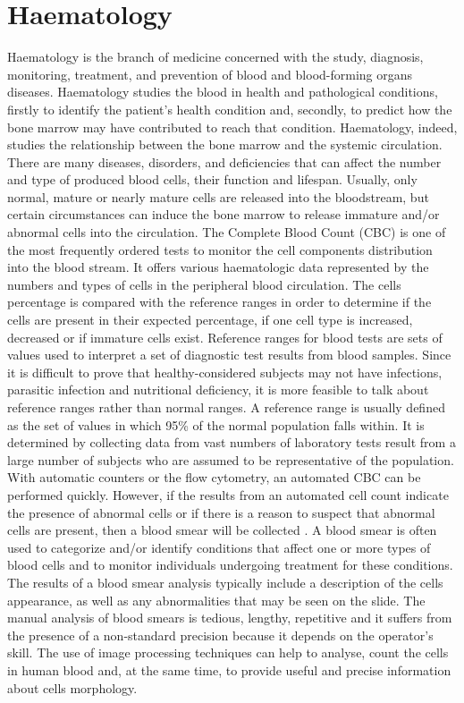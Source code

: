\documentclass[final,a4paper,12pt,english]{UnicaPhdThesis3}
\begin{document}
\section{Haematology} %
Haematology is the branch of medicine concerned with the study, diagnosis, monitoring, treatment, and prevention of blood and blood-forming organs diseases. Haematology studies the blood in health and pathological conditions, firstly to identify the patient’s health condition and, secondly, to predict how the bone marrow may have contributed to reach that condition. 
Haematology, indeed, studies the relationship between the bone marrow and the systemic circulation. There are many diseases, disorders, and deficiencies that can affect the number and type of produced blood cells, their function and lifespan. Usually, only normal, mature or nearly mature cells are released into the bloodstream, but certain circumstances can induce the bone marrow to release immature and/or abnormal cells into the circulation. The Complete Blood Count (CBC) is one of the most frequently ordered tests to monitor the cell components distribution into the blood stream. It offers various haematologic data represented by the numbers and types of cells in the peripheral blood circulation. The cells percentage is compared with the reference ranges in order to determine if the cells are present in their expected percentage, if one cell type is increased, decreased or if immature cells exist. Reference ranges for blood tests are sets of values used to interpret a set of diagnostic test results from blood samples. Since it is difficult to prove that healthy-considered subjects may not have infections, parasitic infection and nutritional deficiency, it is more feasible to talk about reference ranges rather than normal ranges. A reference range is usually defined as the set of values in which 95\% of the normal population falls within. It is determined by collecting data from vast numbers of laboratory tests result from a large number of subjects who are assumed to be representative of the population. With automatic counters or the flow cytometry, an automated CBC can be performed quickly. However, if the results from an automated cell count indicate the presence of abnormal cells or if there is a reason to suspect that abnormal cells are present, then a blood smear will be collected \cite{Loddo2016}. A blood smear is often used to categorize and/or identify conditions that affect one or more types of blood cells and to monitor individuals undergoing treatment for these conditions. The results of a blood smear analysis typically include a description of the cells appearance, as well as any abnormalities that may be seen on the slide. The manual analysis of blood smears is tedious, lengthy, repetitive and it suffers from the presence of a non-standard precision because it depends on the operator's skill. The use of image processing techniques can help to analyse, count the cells in human blood and, at the same time, to provide useful and precise information about cells morphology.
\end{document}
